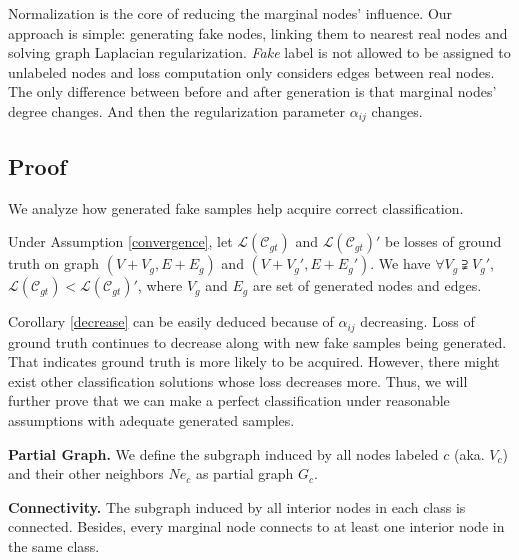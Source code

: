 Normalization is the core of reducing the marginal nodes' influence. Our approach is  simple: generating fake nodes, linking them to nearest real nodes and solving graph Laplacian regularization. \emph{Fake} label is not allowed to be assigned to unlabeled nodes and loss computation only considers edges between real nodes. The only difference between before and after generation is that marginal nodes' degree changes. And then the regularization parameter $\alpha_{ij}$ changes. 

\subsection{Proof}
We analyze 
how generated fake samples help acquire correct classification.

\begin{corollary}\label{decrease} Under Assumption \ref{convergence}, let $\mathcal{L}(\mathcal{C}_{gt})$ and $\mathcal{L}(\mathcal{C}_{gt})'$ be losses of ground truth on graph $(V + V_g, E + E_g)$ and $(V + V_g', E + E_g')$. We have $\forall V_g \supsetneqq V_g'$, $\mathcal{L}(\mathcal{C}_{gt}) < \mathcal{L}(\mathcal{C}_{gt})'$, where $V_g$ and $E_g$ are set of generated nodes and edges.
\end{corollary}

Corollary \ref{decrease} can be easily deduced because of $\alpha_{ij}$ decreasing. Loss of ground truth continues to decrease along with new fake samples being generated. That indicates ground truth is more likely to be acquired. However, there might exist other classification solutions whose loss decreases more. Thus, we will further prove that we can make a perfect classification under reasonable assumptions with adequate generated samples.
 
\begin{definition} \textbf{Partial Graph.} We define the subgraph induced by all nodes labeled $c$ (aka. $V_c$) and their other neighbors $Ne_c$ as partial graph $G_c$.
\end{definition}
\begin{assumption}\label{connectivity} \textbf{Connectivity.}
The subgraph induced by all interior nodes in each class is connected. Besides, every marginal node connects to at least one interior node in the same class.
\end{assumption}


